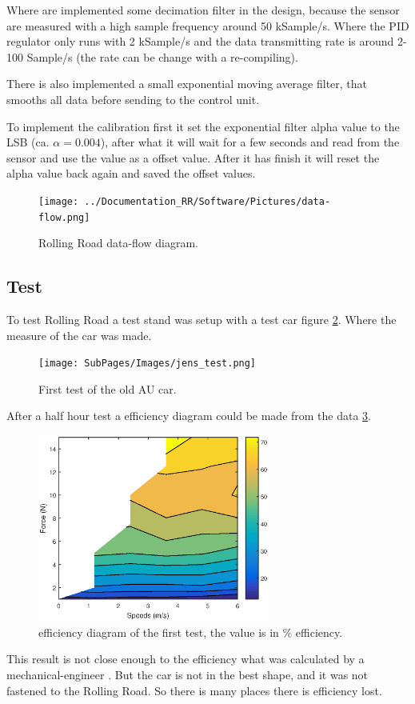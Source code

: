  Where are implemented some decimation filter in the design, because the sensor are measured with a high sample frequency around 50 kSample/s. Where the PID regulator only runs with 2 kSample/s and the data transmitting rate is around 2-100 Sample/s (the rate can be change with a re-compiling).
 
There is also implemented a small exponential moving average filter, that smooths all data before sending to the control unit.  

To implement the calibration first it set the exponential filter alpha value to the LSB (ca. $ \alpha = 0.004 $), after what it will wait for a few seconds and read from the sensor and use the value as a offset value. After it has finish it will reset the alpha value back again and saved the offset values. 

\begin{figure}[H]
	\centering
	\texttt{[image: ../Documentation\_RR/Software/Pictures/data-flow.png]}
	\caption{Rolling Road data-flow diagram.}
	\label{fig:data_flow_diagram}
\end{figure}
\subsection{Test}
To test Rolling Road a test stand was setup with a test car figure \ref{fig:RR_first_test}. Where the measure of the car was made. 
\begin{figure}[H]
	\centering
	\texttt{[image: SubPages/Images/jens\_test.png]}
	\caption{First test of the old AU car.}
	\label{fig:RR_first_test}
\end{figure}
After a half hour test a efficiency diagram could be made from the data \ref{fig:RR_first_test_result}.

\begin{figure}[H] 
	\centering
	\includegraphics [width=3in]{SubPages/Images/RR_test_result.eps}
	\caption{efficiency diagram of the first test, the value is in \% efficiency.}
	\label{fig:RR_first_test_result}
\end{figure}
This result is not close enough to the efficiency what was calculated by a mechanical-engineer \cite{BAC_zenith33}. But the car is not in the best shape, and it was not fastened to the Rolling Road. So there is many places there is efficiency lost.


